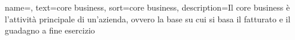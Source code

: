 
\renewcommand{\acronymname}{Acronimi e abbreviazioni}



\renewcommand{\glossaryname}{Glossario}

{
    name=,
    text=core business,
    sort=core business,
    description={Il core business è l'attività principale di un'azienda, ovvero la base su cui si basa il fatturato e il guadagno a fine esercizio}
}

